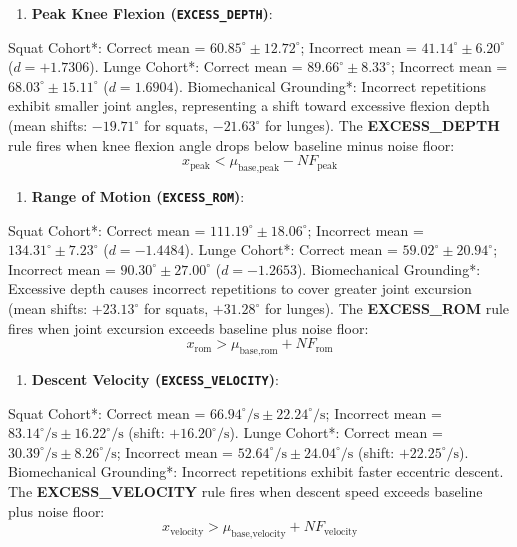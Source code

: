 \begin{enumerate}
  \item \textbf{Peak Knee Flexion (\texttt{EXCESS\_DEPTH})}:
\end{enumerate}
\textit{   }Squat Cohort*: Correct mean = $60.85^\circ \pm 12.72^\circ$; Incorrect mean = $41.14^\circ \pm 6.20^\circ$ ($d = +1.7306$).
\textit{   }Lunge Cohort*: Correct mean = $89.66^\circ \pm 8.33^\circ$; Incorrect mean = $68.03^\circ \pm 15.11^\circ$ ($d = 1.6904$).
\textit{   }Biomechanical Grounding*: Incorrect repetitions exhibit smaller joint angles, representing a shift toward excessive flexion depth (mean shifts: $-19.71^\circ$ for squats, $-21.63^\circ$ for lunges). The \textbf{EXCESS\_DEPTH} rule fires when knee flexion angle drops below baseline minus noise floor:
\begin{equation}
  x_{\text{peak}} < \mu_{\text{base}, \text{peak}} - NF_{\text{peak}}
  \label{eq:disp2}
\end{equation}
\begin{enumerate}
  \item \textbf{Range of Motion (\texttt{EXCESS\_ROM})}:
\end{enumerate}
\textit{   }Squat Cohort*: Correct mean = $111.19^\circ \pm 18.06^\circ$; Incorrect mean = $134.31^\circ \pm 7.23^\circ$ ($d = -1.4484$).
\textit{   }Lunge Cohort*: Correct mean = $59.02^\circ \pm 20.94^\circ$; Incorrect mean = $90.30^\circ \pm 27.00^\circ$ ($d = -1.2653$).
\textit{   }Biomechanical Grounding*: Excessive depth causes incorrect repetitions to cover greater joint excursion (mean shifts: $+23.13^\circ$ for squats, $+31.28^\circ$ for lunges). The \textbf{EXCESS\_ROM} rule fires when joint excursion exceeds baseline plus noise floor:
\begin{equation}
  x_{\text{rom}} > \mu_{\text{base}, \text{rom}} + NF_{\text{rom}}
  \label{eq:disp3}
\end{equation}
\begin{enumerate}
  \item \textbf{Descent Velocity (\texttt{EXCESS\_VELOCITY})}:
\end{enumerate}
\textit{   }Squat Cohort*: Correct mean = $66.94^\circ/\text{s} \pm 22.24^\circ/\text{s}$; Incorrect mean = $83.14^\circ/\text{s} \pm 16.22^\circ/\text{s}$ (shift: $+16.20^\circ/\text{s}$).
\textit{   }Lunge Cohort*: Correct mean = $30.39^\circ/\text{s} \pm 8.26^\circ/\text{s}$; Incorrect mean = $52.64^\circ/\text{s} \pm 24.04^\circ/\text{s}$ (shift: $+22.25^\circ/\text{s}$).
\textit{   }Biomechanical Grounding*: Incorrect repetitions exhibit faster eccentric descent. The \textbf{EXCESS\_VELOCITY} rule fires when descent speed exceeds baseline plus noise floor:
\begin{equation}
  x_{\text{velocity}} > \mu_{\text{base}, \text{velocity}} + NF_{\text{velocity}}
  \label{eq:disp4}
\end{equation}

